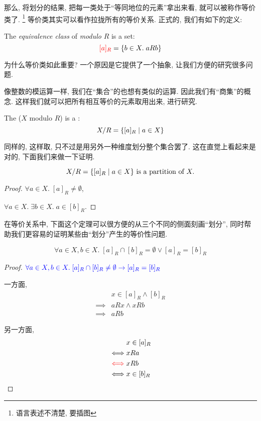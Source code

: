 那么, 将划分的结果, 把每一类处于``等同地位的元素''拿出来看, 就可以被称作等价类了. \footnote{语言表述不清楚, 要插图} 等价类其实可以看作拉拢所有的等价关系. 正式的, 我们有如下的定义: 

\begin{definition}
  The {\it equivalence class} of  {\it modulo} $R$ is a set:
  \[
    \textcolor{red}{[a]_{R}} = \{b \in X.\; a R b\}
  \]
\end{definition}

为什么等价类如此重要? 一个原因是它提供了一个抽象, 让我们方便的研究很多问题. 

像整数的模运算一样, 我们在``集合''的也想有类似的运算. 因此我们有``商集''的概念. 这样我们就可以把所有相互等价的元素取用出来, 进行研究. 

\begin{definition}
  The   ($X$ modulo $R$)
  is a :
  \[
    X/R = \{[a]_{R} \mid a \in X\}
  \]
\end{definition}

同样的, 这样取, 只不过是用另外一种维度划分整个集合罢了. 这在直觉上看起来是对的, 下面我们来做一下证明. 

\begin{theorem}
  \[
    X/R = \{[a]_{R} \mid a \in X\} \text{ is a partition of } X.
  \]
\end{theorem}

\begin{proof}
  $\forall a \in X.\; [a]_{R} \neq \emptyset$, 

  $\forall a \in X.\; \exists b \in X.\; a \in [b]_{R}$.
\end{proof}

在等价关系中, 下面这个定理可以很方便的从三个不同的侧面刻画``划分'', 同时帮助我们更容易的证明某些由``划分''产生的等价性问题. 

\begin{theorem}
  \[
      \forall a \in X, b \in X.\; [a]_{R} \cap [b]_{R} = \emptyset \lor [a]_{R} = [b]_{R}
  \]
\end{theorem}

\begin{proof}
  $\textcolor{blue}{\forall a \in X, b \in X.\; [a]_{R} \cap [b]_{R} \neq \emptyset \to [a]_{R} = [b]_{R}}$

  一方面, 
      \setcounter{equation}{0}
      \begin{align}
        &x \in [a]_{R} \land [b]_{R} \\
        \implies& aRx \land xRb \\
        \implies& aRb
      \end{align}

  另一方面, 
      \setcounter{equation}{0}
      \begin{align}
        &x \in [a]_{R} \\
        \iff& x R a \\
        \textcolor{red}{\iff}& x R b \\
        \iff& x \in [b]_{R}
      \end{align}
\end{proof}


